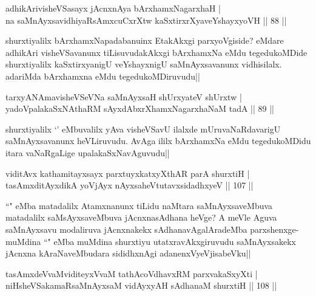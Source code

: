
\begin{shl}
adhikArivisheVSasayx jAcnxnAya bArxhamxNagarxhaH |\\
na saMnAyxsavidhiyaRsAmxcuCxrXtw kaSxtirxrXyaveYshayxyoVH \hfill || 88 ||
\end{shl}

\begin{artha}
shurxtiyalilx bArxhamxNapadabanuinx EtakAkxgi parxyoVgiside? eMdare adhikAri visheVSavanunx tiLisuvudakAkxgi bArxhamxNa eMdu tegedukoMDide shurxtiyalilx kaSxtirxyanigU veYshayxnigU saMnAyxsavanunx vidhisilalx. adariMda bArxhamxna eMdu tegedukoMDiruvudu||
\end{artha}


\begin{shl}
tarxyANAmavisheVSeVNa saMnAyxsaH shUrxyateV shUrxtw |\\
yadoVpalakaSxNAthaRM sAyxdAbxrXhamxNagarxhaNaM tadA \hfill || 89 ||
\end{shl}

\begin{artha}
shurxtiyalilx `\stext ' eMbuvalilx yAva visheVSavU ilalxde mUruvaNaRdavarigU saMnAyxsavanunx heVLiruvudu. AvAga ililx bArxhamxNa eMdu tegedukoMDidu itara vaNaRgaLige upalakaSxNavAguvudu||
\end{artha}

\begin{shl}
viditAvx kathamitayxsayx parxtuyxkatxyXthAR parA shurxtiH |\\
tasAmxditAyxdikA yoVjAyx nAyxsaheVtutavxsidadhxyeV \hfill || 107 ||
\end{shl}

\begin{artha}
``\stext" eMba matadalilx Atamxnanunx tiLidu naMtara saMnAyxsaveMbuva matadalilx saMsAyxsaveMbuva jAcnxnasAdhana heVge? A meVle Aguva saMnAyxsavu modaliruva jAcnxnakekx sAdhanavAgalAradeMba parxshenxge-muMdina ``\stext" eMba muMdina shurxtiyu utatxravAkxgiruvudu saMnAyxsakekx jAcnxna kAraNaveMbudara sididhxnAgi adanenxVyeVjisabeVku||
\end{artha}

\begin{shl}
tasAmxdeVvaMviditeyxVvaM tathAcoVdhavxRM parxvakaSxyXti |\\
niHsheVSakamaRsaMnAyxsaM vidAyxyAH sAdhanaM shurxtiH \hfill || 108 ||
\end{shl}

